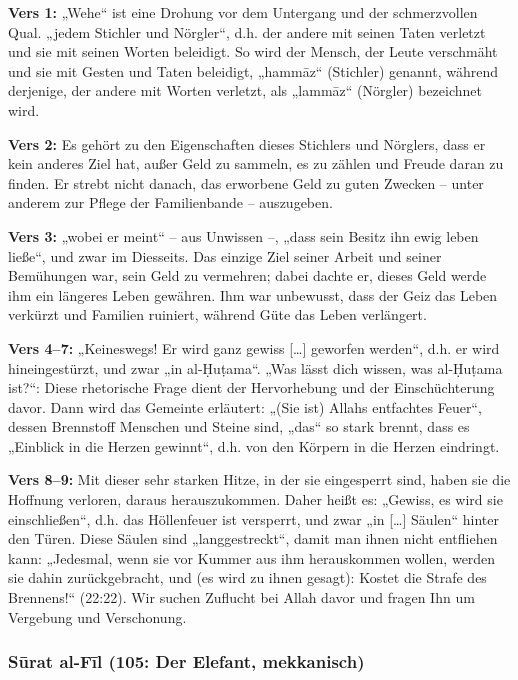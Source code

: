 \textbf{Vers 1:} „Wehe“ ist eine Drohung vor dem Untergang und der schmerzvollen Qual. „jedem
Stichler und Nörgler“, d.h. der andere mit seinen Taten verletzt und sie mit seinen Worten
beleidigt. So wird der Mensch, der Leute verschmäht und sie mit Gesten und Taten beleidigt,
„hammāz“ (Stichler) genannt, während derjenige, der andere mit Worten verletzt, als „lammāz“
(Nörgler) bezeichnet wird.

\textbf{Vers 2:} Es gehört zu den Eigenschaften dieses Stichlers und Nörglers, dass er kein anderes
Ziel hat, außer Geld zu sammeln, es zu zählen und Freude daran zu finden. Er strebt nicht danach,
das erworbene Geld zu guten Zwecken – unter anderem zur Pflege der Familienbande –
auszugeben.

\textbf{Vers 3:} „wobei er meint“ – aus Unwissen –, „dass sein Besitz ihn ewig leben ließe“, und
zwar im Diesseits. Das einzige Ziel seiner Arbeit und seiner Bemühungen war, sein Geld zu
vermehren; dabei dachte er, dieses Geld werde ihm ein längeres Leben gewähren. Ihm war
unbewusst, dass der Geiz das Leben verkürzt und Familien ruiniert, während Güte das Leben
verlängert.

\textbf{Vers 4–7:} „Keineswegs! Er wird ganz gewiss […] geworfen werden“, d.h. er wird
hineingestürzt, und zwar „in al-Ḥuṭama“. „Was lässt dich wissen, was al-Ḥuṭama ist?“: Diese
rhetorische Frage dient der Hervorhebung und der Einschüchterung davor. Dann wird das
Gemeinte erläutert: „(Sie ist) Allahs entfachtes Feuer“, dessen Brennstoff Menschen und Steine
sind, „das“ so stark brennt, dass es „Einblick in die Herzen gewinnt“, d.h. von den Körpern in die
Herzen eindringt.

\textbf{Vers 8–9:} Mit dieser sehr starken Hitze, in der sie eingesperrt sind, haben sie die Hoffnung
verloren, daraus herauszukommen. Daher heißt es: „Gewiss, es wird sie einschließen“, d.h. das
Höllenfeuer ist versperrt, und zwar „in […] Säulen“ hinter den Türen. Diese Säulen sind
„langgestreckt“, damit man ihnen nicht entfliehen kann: „Jedesmal, wenn sie vor Kummer aus ihm
herauskommen wollen, werden sie dahin zurückgebracht, und (es wird zu ihnen gesagt): Kostet
die Strafe des Brennens!“ (22:22). Wir suchen Zuflucht bei Allah davor und fragen Ihn um
Vergebung und Verschonung.

\subsubsection*{Sūrat al-Fīl (105: Der Elefant, mekkanisch)}

